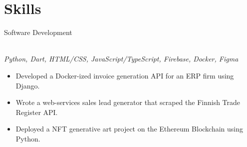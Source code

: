 \documentclass[a4paper,11pt]{article}
\newcommand{\hdr}[2]{{\raggedright\Large #1 \hfill #2}}
\newcommand{\itm}{\item[-]}
\begin{document}
\section{Skills}
\hdr{Software Development}{}\\[2mm]
\emph{\large Python, Dart, HTML/CSS, JavaScript/TypeScript, Firebase, Docker, Figma}
\smallskip
\begin{itemize}
	\itm Developed a Docker-ized invoice generation API for an ERP firm using Django.
	\itm Wrote a web-services sales lead generator that scraped the Finnish Trade Register API.
	\itm Deployed a NFT generative art project on the Ethereum Blockchain using Python.
\end{itemize}
\end{document}
